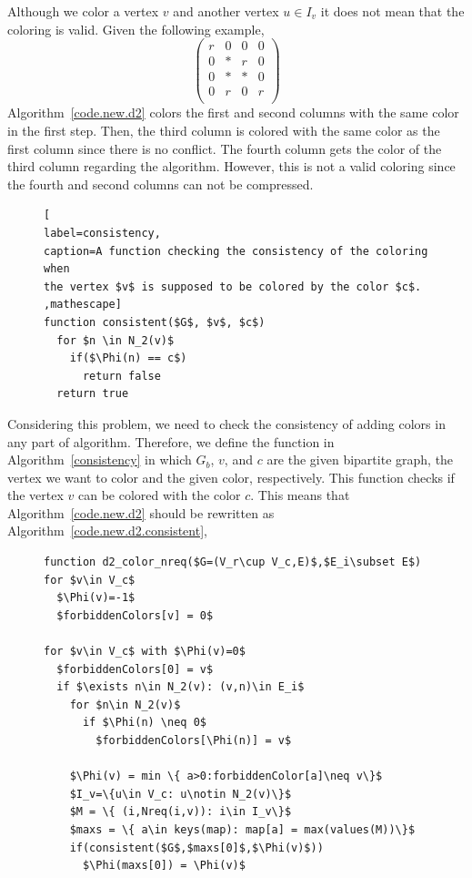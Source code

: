 \documentclass[11pt, twoside,a4paper]{book}
\newcommand{\coderef}[1]{Algorithm~\protect\ref{#1}}
\begin{document}
Although we color a vertex $v$ and another vertex $u\in I_v$
it does not mean that the coloring is valid.
Given the following example,
\begin{equation}
\left(\begin{array}{cccc}
r & 0 & 0 & 0  \\
0 & * & r & 0 \\
0 & * & * & 0 \\
0 & r & 0 & r \\
\end{array}\right)
\label{twocolorings}
\end{equation}
\coderef{code.new.d2} colors the first and second columns with the same color
in the first step. Then, the third column is colored with the same color as the
first column since there is no conflict. The fourth column gets the color of
the third column regarding the algorithm. However, this is not a valid coloring
since the fourth and second columns can not be compressed.
\begin{figure}
\begin{lstlisting}[
label=consistency,
caption=A function checking the consistency of the coloring when
the vertex $v$ is supposed to be colored by the color $c$.
,mathescape]
function consistent($G$, $v$, $c$)
  for $n \in N_2(v)$
    if($\Phi(n) == c$)
      return false
  return true
\end{lstlisting}
\end{figure}

Considering this problem, we need to check the consistency of adding colors in
any part of algorithm. Therefore, we define the function in \coderef{consistency} in which
$G_b$, $v$, and $c$ are the given bipartite graph, the vertex we want to color
and the given color, respectively.
This function checks if the vertex $v$ can be colored with the color $c$.
This means that \coderef{code.new.d2} should be rewritten as \coderef{code.new.d2.consistent},
\begin{figure}
\begin{lstlisting}[caption=New coloring heuristic for distance-$2$ coloring
considering the nonrequired elements and checking the consistency.,
label=code.new.d2.consistent,mathescape]
function d2_color_nreq($G=(V_r\cup V_c,E)$,$E_i\subset E$)
for $v\in V_c$
  $\Phi(v)=-1$
  $forbiddenColors[v] = 0$

for $v\in V_c$ with $\Phi(v)=0$
  $forbiddenColors[0] = v$
  if $\exists n\in N_2(v): (v,n)\in E_i$
    for $n\in N_2(v)$
      if $\Phi(n) \neq 0$
        $forbiddenColors[\Phi(n)] = v$

    $\Phi(v) = min \{ a>0:forbiddenColor[a]\neq v\}$
    $I_v=\{u\in V_c: u\notin N_2(v)\}$
    $M = \{ (i,Nreq(i,v)): i\in I_v\}$
    $maxs = \{ a\in keys(map): map[a] = max(values(M))\}$
    if(consistent($G$,$maxs[0]$,$\Phi(v)$))
      $\Phi(maxs[0]) = \Phi(v)$
\end{lstlisting}
\end{figure}
\end{document}

